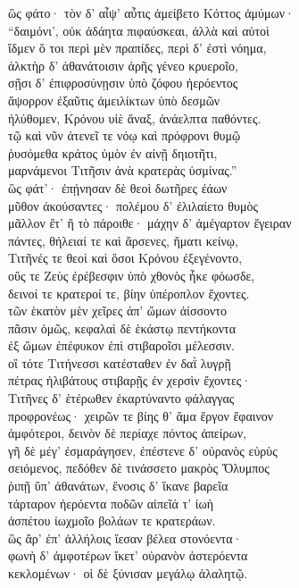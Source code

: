 \begin{pages}
\begin{Leftside}
\quad{}ὣς φάτο· τὸν δ' αἶψ' αὖτις ἀμείβετο Κόττος ἀμύμων· \\
``δαιμόνι', οὐκ ἀδάητα πιφαύσκεαι, ἀλλὰ καὶ αὐτοὶ  \\
ἴδμεν ὅ τοι περὶ μὲν πραπίδες, περὶ δ' ἐστὶ νόημα,\\
ἀλκτὴρ δ' ἀθανάτοισιν ἀρῆς γένεο κρυεροῖο, \\
σῇσι δ' ἐπιφροσύνῃσιν ὑπὸ ζόφου ἠερόεντος\\
ἄψορρον ἐξαῦτις ἀμειλίκτων ὑπὸ δεσμῶν\\
ἠλύθομεν, Κρόνου υἱὲ ἄναξ, ἀνάελπτα παθόντες. \\
τῷ καὶ νῦν ἀτενεῖ τε νόῳ καὶ πρόφρονι θυμῷ\\
ῥυσόμεθα κράτος ὑμὸν ἐν αἰνῇ δηιοτῆτι, \\
μαρνάμενοι Τιτῆσιν ἀνὰ κρατερὰς ὑσμίνας.'' \\
ὣς φάτ'· ἐπῄνησαν δὲ θεοὶ δωτῆρες ἐάων \\
μῦθον ἀκούσαντες· πολέμου δ' ἐλιλαίετο θυμὸς  \\
μᾶλλον ἔτ' ἢ τὸ πάροιθε· μάχην δ' ἀμέγαρτον ἔγειραν \\
πάντες, θήλειαί τε καὶ ἄρσενες, ἤματι κείνῳ,\\
Τιτῆνές τε θεοὶ καὶ ὅσοι Κρόνου ἐξεγένοντο,\\
οὕς τε Ζεὺς ἐρέβεσφιν ὑπὸ χθονὸς ἧκε φόωσδε,\\
δεινοί τε κρατεροί τε, βίην ὑπέροπλον ἔχοντες. \\
τῶν ἑκατὸν μὲν χεῖρες ἀπ' ὤμων ἀίσσοντο\\
πᾶσιν ὁμῶς, κεφαλαὶ δὲ ἑκάστῳ πεντήκοντα\\
ἐξ ὤμων ἐπέφυκον ἐπὶ στιβαροῖσι μέλεσσιν.\\
οἳ τότε Τιτήνεσσι κατέσταθεν ἐν δαῒ λυγρῇ\\
πέτρας ἠλιβάτους στιβαρῇς ἐν χερσὶν ἔχοντες·  \\
Τιτῆνες δ' ἑτέρωθεν ἐκαρτύναντο φάλαγγας\\
προφρονέως· χειρῶν τε βίης θ' ἅμα ἔργον ἔφαινον \\
ἀμφότεροι, δεινὸν δὲ περίαχε πόντος ἀπείρων,\\
γῆ δὲ μέγ' ἐσμαράγησεν, ἐπέστενε δ' οὐρανὸς εὐρὺς\\
σειόμενος, πεδόθεν δὲ τινάσσετο μακρὸς Ὄλυμπος \\
ῥιπῇ ὕπ' ἀθανάτων, ἔνοσις δ' ἵκανε βαρεῖα\\
τάρταρον ἠερόεντα ποδῶν αἰπεῖά τ' ἰωὴ\\
ἀσπέτου ἰωχμοῖο βολάων τε κρατεράων. \\
ὣς ἄρ' ἐπ' ἀλλήλοις ἵεσαν βέλεα στονόεντα· \\
φωνὴ δ' ἀμφοτέρων ἵκετ' οὐρανὸν ἀστερόεντα \\
κεκλομένων· οἱ δὲ ξύνισαν μεγάλῳ ἀλαλητῷ. \\


\end{Leftside}
\end{pages}
